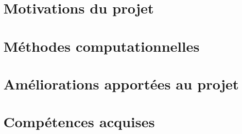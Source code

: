 \author{
{\FirstNameA\ \AuthorA\ } 
{\FirstNameB\ \AuthorB\ }
}

\institute{
{\InstituteA }
{\InstituteB }
}           

\conference{\Conference}
 
\maketitle

\begin{multicols}{3}

\section{Motivations du projet}
\ParagMotiv
\columnbreak

\section{Méthodes computationnelles}
\ParagMethComp
\columnbreak

\section{Améliorations apportées au projet}
\ParagAmelio

\section{Compétences acquises}
\ParagCompAcqu

\end{multicols}

